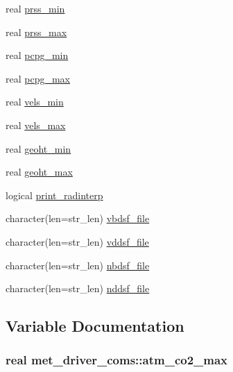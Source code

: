 \begin{DoxyCompactItemize}
\item 
real \hyperlink{namespacemet__driver__coms_a2ce8ae5dcf47b145fe6e4e73111f583a}{prss\+\_\+min}
\item 
real \hyperlink{namespacemet__driver__coms_ad1eb689e5f4208a3cb8c1565220b7f2f}{prss\+\_\+max}
\item 
real \hyperlink{namespacemet__driver__coms_ad1841d1a071652e80742e648d0eed3e8}{pcpg\+\_\+min}
\item 
real \hyperlink{namespacemet__driver__coms_adb27c5034caa99a0fcc4d3b42ef1d2e3}{pcpg\+\_\+max}
\item 
real \hyperlink{namespacemet__driver__coms_ac3d38fa5850b9e27104cf9949d2b5c15}{vels\+\_\+min}
\item 
real \hyperlink{namespacemet__driver__coms_a95bff007e6bff6167b2a89758d76fc2e}{vels\+\_\+max}
\item 
real \hyperlink{namespacemet__driver__coms_a2662a56fa4062bd473b19c649fa43b95}{geoht\+\_\+min}
\item 
real \hyperlink{namespacemet__driver__coms_aa1669f7b7ef87420b77b82855f067517}{geoht\+\_\+max}
\item 
logical \hyperlink{namespacemet__driver__coms_a12635d011e458fe5603d8af326faa956}{print\+\_\+radinterp}
\item 
character(len=str\+\_\+len) \hyperlink{namespacemet__driver__coms_a5077cb97033c5b4e610edbe044ce890e}{vbdsf\+\_\+file}
\item 
character(len=str\+\_\+len) \hyperlink{namespacemet__driver__coms_aeb25a3a4ea0b2fd649a7bab6b694d8be}{vddsf\+\_\+file}
\item 
character(len=str\+\_\+len) \hyperlink{namespacemet__driver__coms_a8f3d2674e75157c654a61aa253ba5ac7}{nbdsf\+\_\+file}
\item 
character(len=str\+\_\+len) \hyperlink{namespacemet__driver__coms_a8adb3cddd748a6ba29fb75dd69ca54c7}{nddsf\+\_\+file}
\end{DoxyCompactItemize}


\subsection{Variable Documentation}
\subsubsection[{\texorpdfstring{atm\+\_\+co2\+\_\+max}{atm_co2_max}}]{\setlength{\rightskip}{0pt plus 5cm}real met\+\_\+driver\+\_\+coms\+::atm\+\_\+co2\+\_\+max}\hypertarget{namespacemet__driver__coms_aec2e25a82647949db4d9bbaafb62220c}{}\label{namespacemet__driver__coms_aec2e25a82647949db4d9bbaafb62220c}

